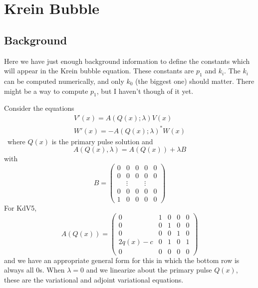 \documentclass[thesis.tex]{subfiles}
\begin{document}
\chapter{Krein Bubble}

\section{Background}

Here we have just enough background information to define the constants which will appear in the Krein bubble equation. These constants are $p_1$ and $k_i$. The $k_i$ can be computed numerically, and only $k_0$ (the biggest one) should matter. There might be a way to compute $p_1$, but I haven't though of it yet.

Consider the equations
\begin{align}
V'(x) = A(Q(x); \lambda) V(x)  \label{Veqlambda} \\
W'(x) = -A(Q(x); \lambda)^* W(x) \label{Weqlambda}
\end{align}\
where $Q(x)$ is the primary pulse solution and 
\[
A(Q(x), \lambda) = A(Q(x)) + \lambda B
\]
with 
\begin{equation*}
B = \begin{pmatrix}0 & 0 & 0 & 0 & 0 \\0 & 0 & 0 & 0 & 0 \\  & 
\vdots & & \vdots & \\0 & 0 & 0 & 0 & 0 \\1 & 0 & 0 & 0 & 0 \end{pmatrix} 
\end{equation*}
For KdV5, 
\begin{equation*}
A(Q(x)) = \begin{pmatrix}0 & 1 & 0 & 0 & 0 \\ 0 & 0 & 1 & 0 & 0 \\ 0 & 0 & 0 & 1 & 0 \\ 2 q(x) - c & 0 & 1 & 0 & 1 \\
0 & 0 & 0 & 0 & 0 
\end{pmatrix}
\end{equation*}
and we have an appropriate general form for this in which the bottom row is always all 0s. When $\lambda = 0$ and we linearize about the primary pulse $Q(x)$, these are the variational and adjoint variational equations.
\end{document}
